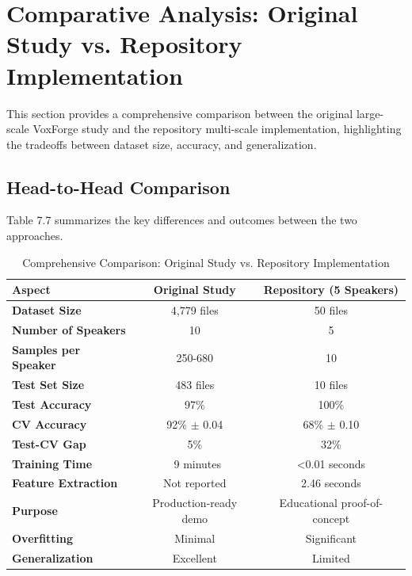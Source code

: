 \documentclass[11pt,twoside,openany]{book}
\begin{document}
\section{Comparative Analysis: Original Study vs. Repository Implementation}
This section provides a comprehensive comparison between the original large-scale VoxForge study and the repository multi-scale implementation, highlighting the tradeoffs between dataset size, accuracy, and generalization.

\subsection{Head-to-Head Comparison}
Table 7.7 summarizes the key differences and outcomes between the two approaches.

\begin{table}[h!]
    \centering
    \begin{tabular}{|l|c|c|}
        \hline
        \textbf{Aspect} & \textbf{Original Study} & \textbf{Repository (5 Speakers)}\\ \hline
        \textbf{Dataset Size} & 4,779 files & 50 files\\ \hline
        \textbf{Number of Speakers} & 10 & 5\\ \hline
        \textbf{Samples per Speaker} & 250-680 & 10\\ \hline
        \textbf{Test Set Size} & 483 files & 10 files\\ \hline
        \textbf{Test Accuracy} & 97\% & 100\%\\ \hline
        \textbf{CV Accuracy} & 92\% $\pm$ 0.04 & 68\% $\pm$ 0.10\\ \hline
        \textbf{Test-CV Gap} & 5\% & 32\%\\ \hline
        \textbf{Training Time} & ~9 minutes & <0.01 seconds\\ \hline
        \textbf{Feature Extraction} & Not reported & 2.46 seconds\\ \hline
        \textbf{Purpose} & Production-ready demo & Educational proof-of-concept\\ \hline
        \textbf{Overfitting} & Minimal & Significant\\ \hline
        \textbf{Generalization} & Excellent & Limited\\ \hline
    \end{tabular}
    \caption{Comprehensive Comparison: Original Study vs. Repository Implementation}
    \label{tab:comparative_analysis}
\end{table}
\end{document}

